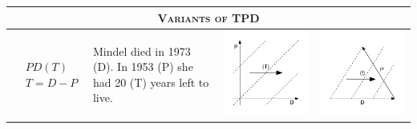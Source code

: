 \documentclass[12pt,oneside,letter]{article} %
\begin{document}
\begin{center}
\begin{longtable}{m{}m{}m{}m{}}
  \midrule
  \multicolumn{4}{c}{\textsc{Variants of TPD}} \\
  \midrule
  $$\begin{aligned}
    &PD(T) \\
    &T = D - P
  \end{aligned}$$ &
  Mindel died in 1973 (D). In 1953 (P) she had 20 (T) years left to live. &
  \includegraphics[width = \linewidth]{Figures/JonasTable/PDt.pdf} &
  \includegraphics[width = \linewidth]{Figures/JonasTable/PDt_iso.pdf}  \\

\end{longtable}
\end{center}
\end{document}
